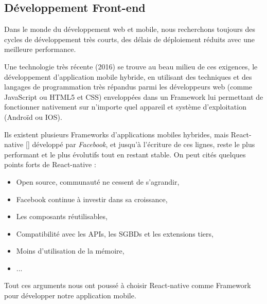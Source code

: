     \subsection{Développement Front-end}
    Dans le monde du développement web et mobile, nous recherchons toujours des cycles de développement très courts, des délais de déploiement réduits avec une meilleure performance.

    Une technologie très récente (2016) se trouve au beau milieu de ces exigences, le développement d'application mobile hybride, en utilisant des techniques et des langages de programmation très répandus parmi les développeurs web (comme JavaScript ou HTML5 et CSS) enveloppées dans un Framework lui permettant de fonctionner nativement sur n'importe quel appareil et système d'exploitation (Androïd ou IOS).

    Ils existent plusieurs Frameworks d'applications mobiles hybrides, mais React-native \autoref{} développé par \emph{Facebook}, et jusqu'à l'écriture de ces lignes, reste le plus performant et le plus évolutifs tout en restant stable. On peut cités quelques points forts de React-native : 
        \begin{itemize}
            \item Open source, communauté ne cessent de s'agrandir,
            \item Facebook continue à investir dans sa croissance,
            \item Les composants réutilisables,
            \item Compatibilité avec les APIs, les SGBDs et les extensions tiers,
            \item Moins d'utilisation de la mémoire,
            \item ...
        \end{itemize}
    Tout ces arguments nous ont poussé à choisir React-native comme Framework pour développer notre application mobile. 

